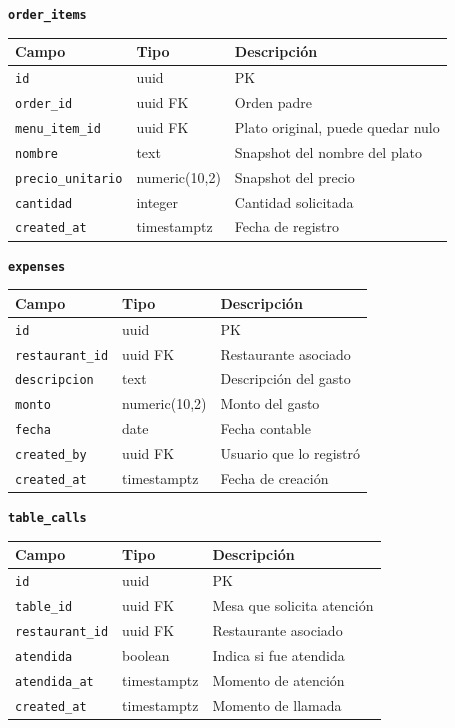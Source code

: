 \vspace{8pt}
\noindent\textbf{\texttt{order\_items}}

\begin{tabular}{lll}
  \toprule
  \textbf{Campo} & \textbf{Tipo} & \textbf{Descripción} \\
  \midrule
  \texttt{id} & uuid & PK \\
  \texttt{order\_id} & uuid FK & Orden padre \\
  \texttt{menu\_item\_id} & uuid FK & Plato original, puede quedar nulo \\
  \texttt{nombre} & text & Snapshot del nombre del plato \\
  \texttt{precio\_unitario} & numeric(10,2) & Snapshot del precio \\
  \texttt{cantidad} & integer & Cantidad solicitada \\
  \texttt{created\_at} & timestamptz & Fecha de registro \\
  \bottomrule
\end{tabular}

\vspace{8pt}
\noindent\textbf{\texttt{expenses}}

\begin{tabular}{lll}
  \toprule
  \textbf{Campo} & \textbf{Tipo} & \textbf{Descripción} \\
  \midrule
  \texttt{id} & uuid & PK \\
  \texttt{restaurant\_id} & uuid FK & Restaurante asociado \\
  \texttt{descripcion} & text & Descripción del gasto \\
  \texttt{monto} & numeric(10,2) & Monto del gasto \\
  \texttt{fecha} & date & Fecha contable \\
  \texttt{created\_by} & uuid FK & Usuario que lo registró \\
  \texttt{created\_at} & timestamptz & Fecha de creación \\
  \bottomrule
\end{tabular}

\vspace{8pt}
\noindent\textbf{\texttt{table\_calls}}

\begin{tabular}{lll}
  \toprule
  \textbf{Campo} & \textbf{Tipo} & \textbf{Descripción} \\
  \midrule
  \texttt{id} & uuid & PK \\
  \texttt{table\_id} & uuid FK & Mesa que solicita atención \\
  \texttt{restaurant\_id} & uuid FK & Restaurante asociado \\
  \texttt{atendida} & boolean & Indica si fue atendida \\
  \texttt{atendida\_at} & timestamptz & Momento de atención \\
  \texttt{created\_at} & timestamptz & Momento de llamada \\
  \bottomrule
\end{tabular}


